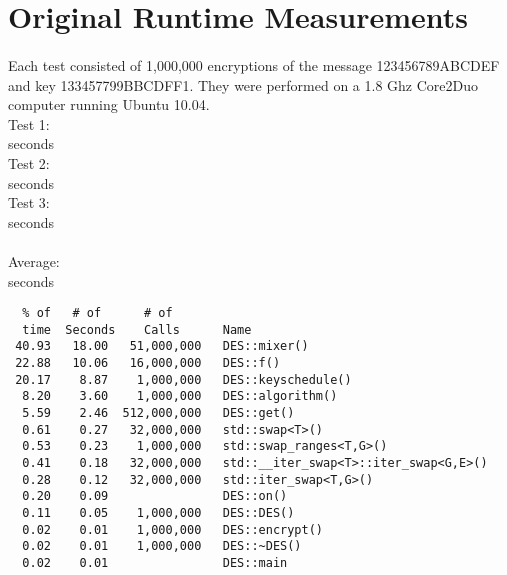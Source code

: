 \documentclass[10pt]{article}
\begin{document}
\section{Original Runtime Measurements}
\paragraph{}Each test consisted of 1,000,000 encryptions of the message 123456789ABCDEF and key 133457799BBCDFF1. They were performed on a 1.8 Ghz Core2Duo computer running Ubuntu 10.04.
\\Test 1:
\\  seconds
\\Test 2:
\\  seconds
\\Test 3:
\\  seconds
\\\\Average:
\\  seconds
\begin{verbatim}
  % of   # of      # of
  time  Seconds    Calls      Name
 40.93   18.00   51,000,000   DES::mixer()
 22.88   10.06   16,000,000   DES::f()
 20.17    8.87    1,000,000   DES::keyschedule()
  8.20    3.60    1,000,000   DES::algorithm()
  5.59    2.46  512,000,000   DES::get()
  0.61    0.27   32,000,000   std::swap<T>()
  0.53    0.23    1,000,000   std::swap_ranges<T,G>()
  0.41    0.18   32,000,000   std::__iter_swap<T>::iter_swap<G,E>()
  0.28    0.12   32,000,000   std::iter_swap<T,G>()
  0.20    0.09                DES::on()
  0.11    0.05    1,000,000   DES::DES()
  0.02    0.01    1,000,000   DES::encrypt()
  0.02    0.01    1,000,000   DES::~DES()
  0.02    0.01                DES::main
\end{verbatim}
\end{document}
